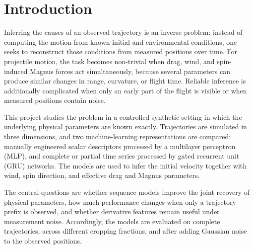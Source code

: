 \section{Introduction}
\label{sec:introduction}

Inferring the causes of an observed trajectory is an inverse problem: instead of computing the motion from known initial and environmental conditions, one seeks to reconstruct those conditions from measured positions over time. For projectile motion, the task becomes non-trivial when drag, wind, and spin-induced Magnus forces act simultaneously, because several parameters can produce similar changes in range, curvature, or flight time. Reliable inference is additionally complicated when only an early part of the flight is visible or when measured positions contain noise.\cite{mehta1985aerodynamics}\cite{goff2009trajectory}

This project studies the problem in a controlled synthetic setting in which the underlying physical parameters are known exactly. Trajectories are simulated in three dimensions, and two machine-learning representations are compared: manually engineered scalar descriptors processed by a multilayer perceptron (MLP), and complete or partial time series processed by gated recurrent unit (GRU) networks.\cite{cho2014gru} The models are used to infer the initial velocity together with wind, spin direction, and effective drag and Magnus parameters.

The central questions are whether sequence models improve the joint recovery of physical parameters, how much performance changes when only a trajectory prefix is observed, and whether derivative features remain useful under measurement noise. Accordingly, the models are evaluated on complete trajectories, across different cropping fractions, and after adding Gaussian noise to the observed positions.
